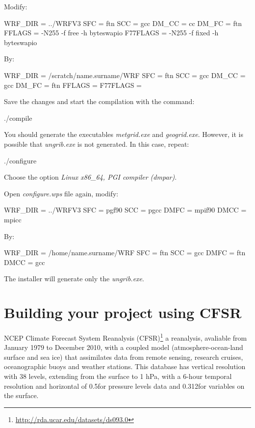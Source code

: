  Modify:
\bigskip

\begin{bashcode}
WRF_DIR  = ../WRFV3
SFC      = ftn
SCC      = gcc
DM_CC    = cc
DM_FC    = ftn
FFLAGS   = -N255 -f free -h byteswapio
F77FLAGS = -N255 -f fixed -h byteswapio

\end{bashcode}
\bigskip

 By:
\bigskip

\begin{bashcode}
WRF_DIR  = /scratch/name.surname/WRF
SFC      = ftn
SCC      = gcc
DM_CC    = gcc
DM_FC    = ftn
FFLAGS   =
F77FLAGS =
\end{bashcode}
\bigskip

 Save the changes and start the compilation with the command:
\bigskip

\begin{bashcode}
./compile
\end{bashcode}
\bigskip

 You should generate the executables \textit{metgrid.exe} and \textit{geogrid.exe}. However, it is possible that \textit{ungrib.exe} 
is not generated. In this case, repeat:
\bigskip

\begin{bashcode}
./configure
\end{bashcode}
\bigskip

 Choose the option \textit{Linux x86\_64, PGI compiler (dmpar)}.
\bigskip

 Open \textit{configure.wps} file again, modify:
\bigskip

\begin{bashcode}
WRF_DIR = ../WRFV3
SFC     = pgf90
SCC     = pgcc
DMFC    = mpif90
DMCC    = mpicc
\end{bashcode}
\bigskip

 By:
\bigskip

\begin{bashcode}
WRF_DIR = /home/name.surname/WRF
SFC     = ftn
SCC     = gcc
DMFC    = ftn
DMCC    = gcc
\end{bashcode}
\bigskip

 The installer will generate only the \textit{ungrib.exe}.

\section{Building your project using CFSR}
\bigskip

 NCEP Climate Forecast System Reanalysis 
(CFSR)\textcolor{bleu_cite}{\textit{}\footnote{\textcolor{bleu_cite}{\href{http://rda.ucar.edu/datasets/ds093.0}{http://rda.ucar.edu/datasets/ds093.0}}}}
a reanalysis, avaliable from January 1979 to December 2010, with a coupled model (atmosphere-ocean-land surface and sea ice) that
assimilates data from remote sensing, research cruises, oceanographic buoys and weather stations. This database
has vertical resolution with 38 levels, extending from the surface to 1 hPa, with a 6-hour temporal resolution
and horizontal of 0.5\degree for pressure levels data and 0.312\degree for variables on the surface.
\bigskip


